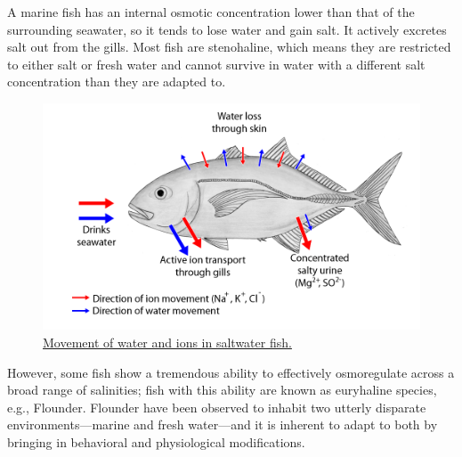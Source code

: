 A marine fish has an internal osmotic concentration lower than that of the surrounding seawater, so it tends to lose water and gain salt. It actively excretes salt out from the gills. Most fish are stenohaline, which means they are restricted to either salt or fresh water and cannot survive in water with a different salt concentration than they are adapted to.



\begin{figure}

{\centering \includegraphics[width=0.7\linewidth]{./figures/excretory/Osmoseragulation_Carangoides_bartholomaei_bw_en2} 

}

\caption{\href{https://en.wikipedia.org/wiki/File:Osmoseragulation_Carangoides_bartholomaei_bw_en2.png}{Movement of water and ions in saltwater fish.}}\label{fig:saltwaterfish}
\end{figure}

However, some fish show a tremendous ability to effectively osmoregulate across a broad range of salinities; fish with this ability are known as euryhaline species, e.g., Flounder. Flounder have been observed to inhabit two utterly disparate environments---marine and fresh water---and it is inherent to adapt to both by bringing in behavioral and physiological modifications.


